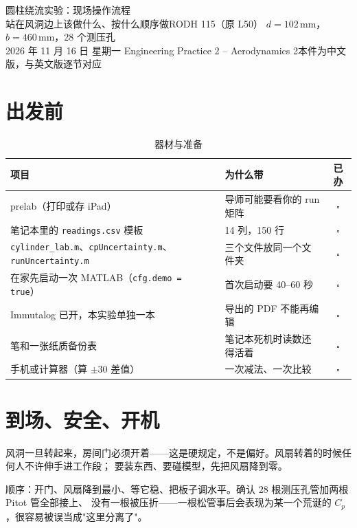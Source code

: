 \documentclass[11pt,a4paper]{ctexart}
\newcommand{\Cp}{\ensuremath{C_p}}
\begin{document}
\begin{center}
{\LARGE\heiti 圆柱绕流实验：现场操作流程}\\[4pt]
{\small 站在风洞边上该做什么、按什么顺序做\quad\textbar\quad RODH 115（原 L50）\quad\textbar\quad
$d = 102$\,mm，$b = 460$\,mm，28 个测压孔}\\[4pt]
{\footnotesize 2026 年 11 月 16 日 星期一\quad\textbar\quad
Engineering Practice 2 -- Aerodynamics 2\quad\textbar\quad 本件为中文版，与英文版逐节对应}
\end{center}

\vspace{2pt}

\section{出发前}

\begin{table}[H]
\centering
\caption{器材与准备}
\small
\begin{tabularx}{\textwidth}{@{}p{6.1cm} X c@{}}
\toprule
项目 & 为什么带 & 已办 \\
\midrule
prelab（打印或存 iPad） & 导师可能要看你的 run 矩阵 & $\square$ \\
笔记本里的 \texttt{readings.csv} 模板 & 14 列，150 行 & $\square$ \\
\texttt{cylinder\_lab.m}、\texttt{cpUncertainty.m}、\texttt{runUncertainty.m} & 三个文件放同一个文件夹 &
$\square$ \\
在家先启动一次 MATLAB（\texttt{cfg.demo = true}） & 首次启动要 40--60 秒 & $\square$ \\
Immutalog 已开，本实验单独一本 & 导出的 PDF 不能再编辑 & $\square$ \\
笔和一张纸质备份表 & 笔记本死机时读数还得活着 & $\square$ \\
手机或计算器（算 $\pm30$ 差值） & 一次减法、一次比较 & $\square$ \\
\bottomrule
\end{tabularx}
\end{table}

\section{到场、安全、开机}

风洞一旦转起来，房间门必须开着——这是硬规定，不是偏好。风扇转着的时候任何人不许伸手进工作段；
要装东西、要碰模型，先把风扇降到零。

顺序：开门、风扇降到最小、等它稳、把板子调水平。确认 28 根测压孔管加两根 Pitot 管全部接上、
没有一根被压折——一根松管事后会表现为某一个荒诞的 \Cp{}，很容易被误当成"这里分离了"。
\end{document}
